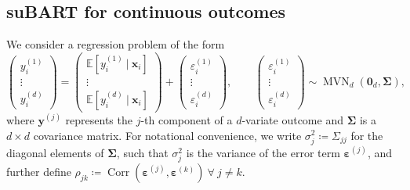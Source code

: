 \documentclass[aoas,preprint]{imsart}
\newcommand\given[1][]{\:#1\vert\:}
\theoremstyle{plain}
\theoremstyle{definition}
\theoremstyle{remark}
\begin{document}
\subsection{suBART for continuous outcomes}\label{sec:suBART_continuous}
We consider a regression problem of the form
\begin{equation}
\begin{pmatrix}  y_i^{(1)} \\ \vdots \\ y_i^{(d)} \end{pmatrix} = 
\begin{pmatrix}  \mathbb{E}\left\lbrack y_i^{(1)}\given \mathbf{x}_i\right\rbrack \\ \vdots \\ \mathbb{E}\left\lbrack y_i^{(d)}\given \mathbf{x}_i\right\rbrack \end{pmatrix} +
\begin{pmatrix}  \varepsilon_i^{(1)} \\ \vdots \\ \varepsilon_i^{(d)} \end{pmatrix},
\qquad\begin{pmatrix}  \varepsilon_i^{(1)} \\ \vdots \\ \varepsilon_i^{(d)} \end{pmatrix} \sim \operatorname{MVN}_d(\mathbf{0}_d, \boldsymbol{\Sigma}),
\label{eq:basic_SUR}
\end{equation}
where $\mathbf{y}^{(j)}$ represents the $j$-th component of a $d$-variate outcome and $\boldsymbol{\Sigma}$ is a $d \times d$ covariance matrix. For notational convenience, we write $\sigma^2_j \coloneqq \Sigma_{jj}$ for the diagonal elements of $\boldsymbol{\Sigma}$, such that $\sigma^2_j$ is the variance of the error term $\boldsymbol{\varepsilon}^{(j)}$, and further define $\rho_{jk} \coloneqq \operatorname{Corr}(\boldsymbol{\varepsilon}^{(j)},\boldsymbol{\varepsilon}^{(k)})\:\forall\:j \neq k$.
\end{document}
